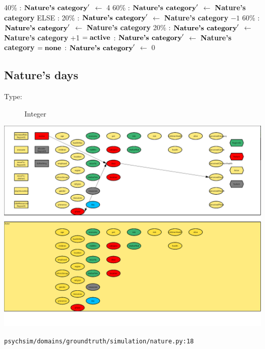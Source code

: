 \documentclass{article}%
\begin{document}
\begin{flushleft}
\hspace*{10em}%
40\%%
: %
$\mbox{\textbf{Nature's category}} '$%
$\leftarrow$%
4%
\linebreak%
\hspace*{10em}%
60\%%
: %
$\mbox{\textbf{Nature's category}} '$%
$\leftarrow$%
\textbf{Nature's category}%
\linebreak%
\hspace*{8em}%
ELSE %
: %
\linebreak%
\hspace*{10em}%
20\%%
: %
$\mbox{\textbf{Nature's category}} '$%
$\leftarrow$%
\textbf{Nature's category}%
${-}1$%
\linebreak%
\hspace*{10em}%
60\%%
: %
$\mbox{\textbf{Nature's category}} '$%
$\leftarrow$%
\textbf{Nature's category}%
\linebreak%
\hspace*{10em}%
20\%%
: %
$\mbox{\textbf{Nature's category}} '$%
$\leftarrow$%
\textbf{Nature's category}%
+1%
\linebreak%
\hspace*{2em}%
$= \mbox{\textbf{active}}$%
: %
$\mbox{\textbf{Nature's category}} '$%
$\leftarrow$%
\textbf{Nature's category}%
\linebreak%
\hspace*{2em}%
$= \mbox{\textbf{none}}$%
: %
$\mbox{\textbf{Nature's category}} '$%
$\leftarrow$%
0%
\end{flushleft}

%
\subsection{Nature's days}%
\label{subsec:Nature's days}%
\begin{description}%
\item[Type:]%
Integer%
\end{description}%
\includegraphics[width=\textwidth]{images/daysOfNature.png}%
\begin{flushleft}%
\verb|psychsim/domains/groundtruth/simulation/nature.py:18|%
\end{flushleft}%
\end{document}
